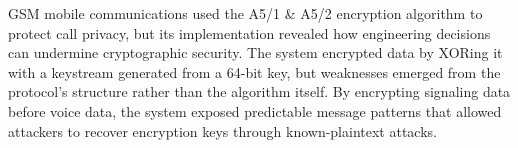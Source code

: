 GSM mobile communications used the A5/1 \& A5/2 encryption algorithm to protect call privacy, but its implementation revealed how engineering decisions can undermine cryptographic security. The system encrypted data by XORing it with a keystream generated from a 64-bit key, but weaknesses emerged from the protocol's structure rather than the algorithm itself. By encrypting signaling data before voice data, the system exposed predictable message patterns that allowed attackers to recover encryption keys through known-plaintext attacks.
